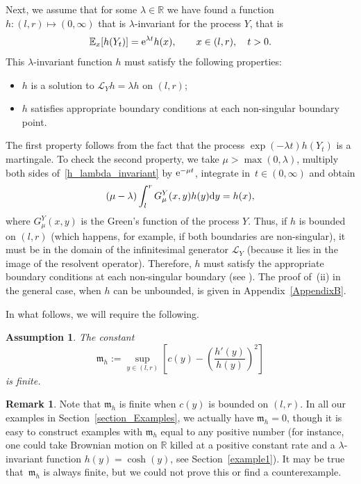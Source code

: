 \documentclass[pdftex]{sigma}
\numberwithin{equation}{section}
\newtheorem{Assumption}[Theorem]{Assumption}
\theoremstyle{definition}
\newtheorem{Remark}[Theorem]{Remark}
\def\L{{\mathcal L}}
\def\e{{\mathbb E}}
\def\r{{\mathbb R}}
\def\d{{\textnormal d}}
\begin{document}
Next, we assume that for some $\lambda \in \r$ we have found a function $h \colon (l,r) \mapsto (0,\infty)$ that is $\lambda$-invariant for the process $Y$, that is
\begin{equation}\label{h_lambda_invariant}
\e_x[h(Y_t)]={\rm e}^{\lambda t} h(x), \qquad x\in (l,r), \quad t>0.
\end{equation}
This $\lambda$-invariant function $h$ must satisfy the following properties:
\begin{itemize}\itemsep=0pt
\item[(i)] $h$ is a solution to $\L_Y h = \lambda h$ on $(l,r)$;
\item[(ii)]%
$h$ satisfies appropriate boundary conditions at each non-singular boundary point.
\end{itemize}
The first property follows from the fact that the process $\exp(-\lambda t) h(Y_t)$ is a martingale. To check the second property, we take $\mu> \max(0,\lambda)$, multiply both sides of~\eqref{h_lambda_invariant} by ${\rm e}^{-\mu t}$, integrate in~${t \in (0,\infty)}$ and obtain
\begin{equation}\label{h_lambda_invariant2}
(\mu - \lambda) \int_l^r G^Y_{\mu}(x,y) h(y) \d y= h(x),
\end{equation}
where $G^Y_{\mu}(x,y)$ is the Green's function of the process $Y$. Thus, if $h$ is bounded on $(l,r)$ (which happens, for example, if both boundaries are non-singular), it must be in the domain of the infinitesimal generator $\L_Y$ (because it lies in the image of the resolvent operator). Therefore, $h$ must satisfy the appropriate boundary conditions at each non-singular boundary (see \cite[Section~II.7]{Borodin2002}). The proof of~(ii) in the general case, when $h$ can be unbounded, is given in Appendix~\ref{AppendixB}.

In what follows, we will require the following.

\begin{Assumption}\label{Assumption_1}
The constant
\begin{equation}\label{def_m_h}
{\mathfrak m}_h:= \sup\limits_{y\in (l,r)} \left[ c(y)- \left(\frac{h'(y)}{h(y)}\right)^2 \right]
\end{equation}
is finite.
\end{Assumption}

\begin{Remark}
 Note that ${\mathfrak m}_h$ is finite when $c(y)$ is bounded on $(l,r)$. In all our examples in Section~\ref{section_Examples}, we actually have ${\mathfrak m}_h=0$, though it is easy to construct examples with ${\mathfrak m}_h$ equal to any positive number (for instance, one could take Brownian motion on $\r$ killed at a positive constant rate and a
 $\lambda$-invariant function $h(y)=\cosh(y)$, see Section~\ref{example1}). It may be true that~${\mathfrak m}_h$ is always finite, but we could not prove this or find a counterexample.
\end{Remark}
\end{document}
